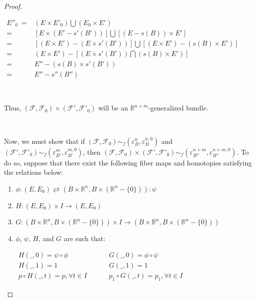 \documentclass[12pt,oneside]{book}
\newcommand{\R}{\mathbb{R}}
\begin{document}
\begin{proof}
        \

        $\begin{array}{rl}
            E''_{0} \ = & (E\times E'_{0})\bigcup (E_{0}\times E') \\
            = & [E\times (E'-s'(B'))]\bigcup [(E-s(B))\times E'] \\
            = & [(E\times E')-(E\times s'(B'))] \bigcup [(E\times E')-(s(B)\times E')] \\
            = & (E\times E')-[(E\times s'(B'))\bigcap (s(B)\times E')] \\
            = & E''-(s(B)\times s'(B')) \\
            = & E''-s''(B'')
        \end{array}$
        
        \
        
        Thus, $(\mathcal{F},\mathcal{F}_{0})\times(\mathcal{F'},\mathcal{F'}_{0})$ will be an $\R^{n+m}$-generalized 
        bundle.

        \
        
        Now, we must show that if $(\mathcal{F},\mathcal{F}_{0})\sim_{f}(\varepsilon^{n}_{B},\varepsilon^{n,0}_{B})$ and 
        $(\mathcal{F'},\mathcal{F'}_{0})\sim_{f}(\varepsilon^{m}_{B'},\varepsilon^{m,0}_{B'})$, then 
        $(\mathcal{F},\mathcal{F}_{0})\times(\mathcal{F'},\mathcal{F'}_{0})\sim_{f}(\varepsilon^{n+m}_{B''},\varepsilon^{n+m,0}_{B''})$. 
        To do so, suppose that there exist the following fiber maps and homotopies satisfying the relations below:
        
        \begin{enumerate}
            \item $\phi:(E,E_{0})\rightleftarrows(B\times \R^{n},B\times (\R^{n}-\{ 0 \})):\psi$
            \item $H:(E,E_{0})\times I\to (E,E_{0})$
            \item $G:(B\times\R^{n},B\times(\R^{n}-\{ 0 \}))\times I\to (B\times\R^{n},B\times(\R^{n}-\{ 0 \}))$
            \item $\phi$, $\psi$, $H$, and $G$ are such that:
            
                $\begin{array}{lcccl}
                    H(\_,0)=\psi\circ\phi            & & & & G(\_,0)=\phi\circ\psi \\
                    H(\_,1)=1                        & & & & G(\_,1)=1 \\
                    p\circ H(\_,t)=p, \forall t\in I & & & & p_{1}\circ G(\_,t)=p_{1}, \forall t\in I
                \end{array}$
        \end{enumerate}


\end{proof}
\end{document}
